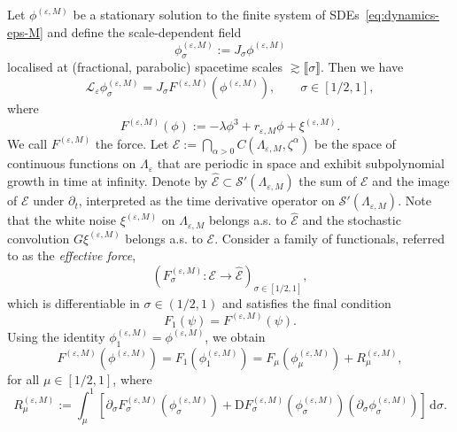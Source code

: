 \documentclass{article}
\numberwithin{equation}{section}
\newcommand{\assign}{:=}
\newcommand{\mathD}{\mathrm{D}}
\newcommand{\mathd}{\mathrm{d}}
\theoremstyle{plain}
\theoremstyle{definition}
\begin{document}
Let $\phi^{(\varepsilon, M)}$ be a stationary solution to the finite system of
SDEs~\eqref{eq:dynamics-eps-M} and define the scale-dependent field
\[ \phi^{(\varepsilon, M)}_{\sigma} \assign J_{\sigma} \phi^{(\varepsilon,
   M)} \]
localised at (fractional, parabolic) spacetime scales $\gtrsim \llbracket
\sigma \rrbracket$. Then we have
\[ \mathcal{L}_{\varepsilon} {\phi_{\sigma}^{(\varepsilon, M)}}  = J_{\sigma}
   F^{(\varepsilon, M)} (\phi^{(\varepsilon, M)}), \qquad \sigma \in [1 / 2,
   1], \]
where
\begin{equation}
  F^{(\varepsilon, M)} (\phi) {\assign - \lambda \phi^3}  + r_{\varepsilon, M}
  \phi + \xi^{(\varepsilon, M)} . \label{eq:force}
\end{equation}
We call $F^{(\varepsilon, M)}$ the force. Let $\mathcal{E} 
\assign \bigcap_{\alpha > 0} C (\Lambda_{\varepsilon, M}, \zeta^{\alpha})$ be
the space of continuous functions on $\Lambda_{\varepsilon}$ that are periodic in space
and exhibit subpolynomial growth in time at infinity. Denote by
$\hat{\mathcal{E}} \subset \mathcal{S}' (\Lambda_{\varepsilon, M})$ the sum of $\mathcal{E}$ and the image
of $\mathcal{E}$ under $\partial_t$, interpreted as the time derivative
operator on $\mathcal{S}' (\Lambda_{\varepsilon, M})$. Note that the white
noise $\xi^{(\varepsilon, M)}$ on $\Lambda_{\varepsilon, M}$ belongs a.s. to
$\hat{\mathcal{E}}$ and the stochastic convolution $G \xi^{(\varepsilon, M)}$
belongs a.s. to $\mathcal{E}$. Consider a family of functionals, referred to
as the {\textit{effective force}},
\[ \left( {F_{\sigma}^{(\varepsilon, M)}}  : \mathcal{E} \rightarrow
   \hat{\mathcal{E}} \right)_{\sigma \in [1 / 2, 1]}, \]
which is differentiable in $\sigma \in (1 / 2, 1)$ and satisfies the final
condition
\begin{equation}
  F _1 (\psi) = F^{(\varepsilon, M)} (\psi) . \label{eq:final-cond-f}
\end{equation}
Using the identity $\phi_1^{(\varepsilon, M)} = \phi^{(\varepsilon, M)}$, we
obtain
\begin{equation}
  F^{(\varepsilon, M)} (\phi^{(\varepsilon, M)}) = F _1 (\phi^{(\varepsilon,
  M)}_1) = F _{\mu} (\phi^{(\varepsilon, M)}_{\mu}) + R_{\mu}^{(\varepsilon,
  M)}, \label{eq:force-F-R}
\end{equation}
for all $\mu \in [1 / 2, 1]$, where
\[ R_{\mu}^{(\varepsilon, M)} \assign \int_{\mu}^1 [\partial_{\sigma}
   F^{(\varepsilon, M)}_{\sigma} (\phi^{(\varepsilon, M)}_{\sigma}) + \mathD
   F^{(\varepsilon, M)}_{\sigma} (\phi^{(\varepsilon, M)}_{\sigma})
   (\partial_{\sigma} \phi^{(\varepsilon, M)}_{\sigma})]\,\mathd \sigma . \]
\end{document}
